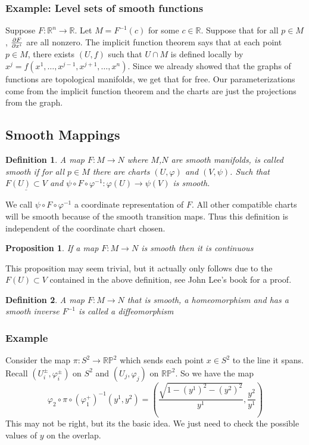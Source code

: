 \documentclass[a4paper]{article}
\newtheorem*{prop}{Proposition}
\newtheorem*{defn}{Definition}
\begin{document}
\subsubsection*{Example: Level sets of smooth functions}%
\label{ssub:Example: Level sets of smooth functions}
Suppose $F: \mathds{R}^n \rightarrow \mathds{R}$. Let $M = F^{-1}(c)$ for some $c \in \mathds{R}$. Suppose that for all $p \in M$, $\pdv{F}{x^i}$ are all nonzero. The implicit function theorem says that at each point $p \in M$, there exists $(U,f)$ such that $U \cap M$ is defined locally by $x^j = f(x^1, \dots, x^{j-1}, x^{j+1}, \dots, x^n)$. Since we already showed that the graphs of functions are topological manifolds, we get that for free. Our parameterizations come from the implicit function theorem and the charts are just the projections from the graph.

\subsection*{Smooth Mappings}%
\label{sub:Smooth Mappings}

\begin{defn}
  A map $F: M \rightarrow N$ where $M$,$N$ are smooth manifolds, is called smooth if for all $p \in M$ there are charts $(U, \varphi)$ and $(V, \psi)$.  Such that $\underline{F(U) \subset V}$ and $\psi \circ F \circ \varphi^{-1}: \varphi(U) \rightarrow \psi(V)$ is smooth.
\end{defn}
We call $\psi \circ F \circ \varphi^{-1}$ a coordinate representation of $F$. All other compatible charts will be smooth because of the smooth transition maps. Thus this definition is independent of the coordinate chart chosen.
\begin{prop}
 If a map $F: M \rightarrow N$ is smooth then it is continuous 
\end{prop}
This proposition may seem trivial, but it actually only follows due to the $F(U) \subset V$ contained in the above definition, see John Lee's book for a proof.

\begin{defn}
  A map $F: M \rightarrow N$ that is smooth, a homeomorphism and has a smooth inverse $F^{-1}$ is called a diffeomorphism
\end{defn}

\subsubsection*{Example}%
Consider the map $\pi: S^2 \rightarrow \mathds{RP}^2$ which sends each point $x \in S^2$ to the line it spans. Recall $(U^\pm_i, \varphi^\pm_i)$ on $S^2$ and $(U_j, \varphi_j)$ on $\mathds{RP}^2$.
So we have the map
\[
    \varphi_2 \circ \pi \circ (\varphi_1^{+})^{-1} (y^1,y^2) = \left( \frac{\sqrt{1 - (y^1)^2 - (y^2)^2}}{y^1} , \frac{y^2}{y^1}\right)
\]
This may not be right, but its the basic idea. We just need to check the possible values of $y$ on the overlap.
\end{document}
